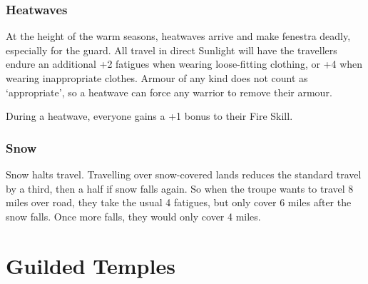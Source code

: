\begin{multicols}{2}
\subsubsection{Heatwaves}

At the height of the warm seasons, heatwaves arrive and make \gls{fenestra} deadly, especially for the \gls{guard}.
All travel in direct Sunlight will have the travellers endure an additional +2 \glspl{fatigue} when wearing loose-fitting clothing, or +4 when wearing inappropriate clothes.
Armour of any kind does not count as `appropriate', so a heatwave can force any warrior to remove their armour.

During a heatwave, everyone gains a +1 bonus to their Fire Skill.

\subsubsection{Snow}

Snow halts travel.
Travelling over snow-covered lands reduces the standard travel by a third, then a half if snow falls again.
So when the troupe wants to travel 8 miles over road, they take the usual 4 \glspl{fatigue}, but only cover 6 miles after the snow falls.
Once more falls, they would only cover 4 miles.

\end{multicols}

\section{Guilded Temples}

